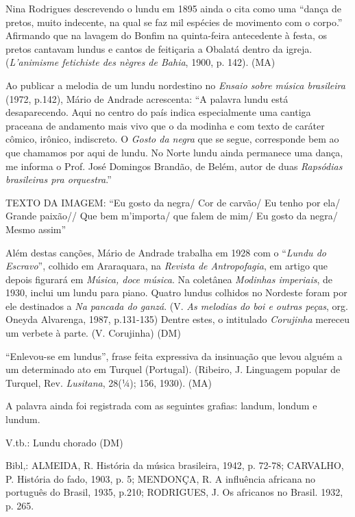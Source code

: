 Nina Rodrigues descrevendo o lundu em 1895 ainda o cita como uma ``dança
de pretos, muito indecente, na qual se faz mil espécies de movimento com
o corpo.'' Afirmando que na lavagem do Bonfim na quinta-feira
antecedente à festa, os pretos cantavam lundus e cantos de feitiçaria a
Obalatá dentro da igreja. (\emph{L'animisme fetichiste des nègres de
Bahia}, 1900, p. 142). (MA)

Ao publicar a melodia de um lundu nordestino no \emph{Ensaio sobre
música brasileira} (1972, p.142), Mário de Andrade acrescenta: ``A
palavra lundu está desaparecendo. Aqui no centro do país indica
especialmente uma cantiga praceana de andamento mais vivo que o da
modinha e com texto de caráter cômico, irônico, indiscreto. O
\emph{Gosto da negra} que se segue, corresponde bem ao que chamamos por
aqui de lundu. No Norte lundu ainda permanece uma dança, me informa o
Prof. José Domingos Brandão, de Belém, autor de duas \emph{Rapsódias
brasileiras pra orquestra}.''


TEXTO DA IMAGEM: ``Eu gosto da negra/ Cor de carvão/ Eu tenho por ela/
Grande paixão// Que bem m'importa/ que falem de mim/ Eu gosto da negra/
Mesmo assim''

Além destas canções, Mário de Andrade
trabalha em 1928 com o ``\emph{Lundu do Escravo}'', colhido em
Araraquara, na \emph{Revista de Antropofagia}, em artigo que depois
figurará em \emph{Música, doce música}. Na coletânea \emph{Modinhas
imperiais}, de 1930, inclui um lundu para piano. Quatro lundus colhidos
no Nordeste foram por ele destinados a \emph{Na pancada do ganzá}. (V.
\emph{As melodias do boi e outras peças}, org. Oneyda Alvarenga, 1987,
p.131-135) Dentre estes, o intitulado \emph{Corujinha} mereceu um
verbete à parte. (V. Corujinha) (DM)

``Enlevou-se em lundus'', frase feita expressiva da insinuação que levou
alguém a um determinado ato em Turquel (Portugal). (Ribeiro, J.
Linguagem popular de Turquel, Rev. \emph{Lusitana}, 28(¼); 156, 1930).
(MA)

A palavra ainda foi registrada com as seguintes grafias: landum, londum
e lundum.

V.tb.: Lundu chorado (DM)

Bibl,: ALMEIDA, R. História da música brasileira, 1942, p. 72-78;
CARVALHO, P. História do fado, 1903, p. 5; MENDONÇA, R. A influência
africana no português do Brasil, 1935, p.210; RODRIGUES, J. Os africanos
no Brasil. 1932, p. 265.


